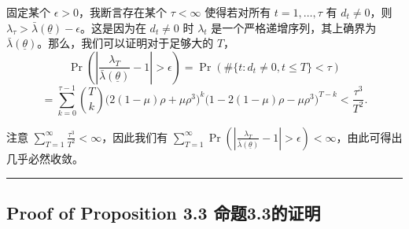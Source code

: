 \documentclass[12pt,a4paper]{article}
\newenvironment{translation}{%
  \par\vspace{2pt}\noindent%
  \color{transblue}%
  \ignorespaces
}{%
  \par\vspace{4pt}\hrule\vspace{6pt}%
}
\begin{document}
\begin{translation}
固定某个 $\epsilon > 0$，我断言存在某个 $\tau < \infty$ 使得若对所有 $t = 1, \dots, \tau$ 有 $d_t \neq 0$，则 $\lambda_\tau > \bar{\lambda}(\underline{\theta}) - \epsilon$。这是因为在 $d_t \neq 0$ 时 $\lambda_t$ 是一个严格递增序列，其上确界为 $\bar{\lambda}(\underline{\theta})$。那么，我们可以证明对于足够大的 $T$，
\[
\Pr\left( \left| \frac{\lambda_T}{\bar{\lambda}(\underline{\theta})} - 1 \right| > \epsilon \right) = \Pr\left( \#\{t: d_t \neq 0, t \leq T\} < \tau \right)
\]
\[
= \sum_{k=0}^{\tau-1} \binom{T}{k} \big(2(1-\mu)\rho + \mu\rho^3\big)^k \big(1 - 2(1-\mu)\rho - \mu\rho^3\big)^{T-k}
< \frac{\tau^3}{T^2}.
\]

注意 $\sum_{T=1}^{\infty} \frac{\tau^3}{T^2} < \infty$，因此我们有 $\sum_{T=1}^{\infty} \Pr\left( \left| \frac{\lambda_T}{\bar{\lambda}(\underline{\theta})} - 1 \right| > \epsilon \right) < \infty$，由此可得出几乎必然收敛。
\end{translation}

\subsection*{Proof of Proposition 3.3 \hfill 命题3.3的证明}
\end{document}
